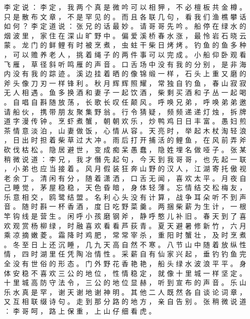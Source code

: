 {李 定 说 ： 李 定 ， 我 两 个 真 是 微 吟 可 以 相 狎 ， 不 必 檀 板 共 金 樽 。
只 是 散 布 文 章 ， 不 是 罕 见 的 。
而 且 各 联 几 句 ， 看 我 们 渔 樵 攀 话 如 何 ？ 李 定 道 说 ： 张 兄 的 话 最 妙 。
请 哥 哥 先 吟 。
船 停 在 绿 水 的 烟 波 里 ， 家 住 在 深 山 旷 野 中 。
偏 爱 溪 桥 春 水 涨 ， 最 怜 岩 石 晓 云 蒙 。
龙 门 的 鲜 鲤 有 时 被 烹 煮 ， 虫 蛀 干 柴 日 烤 烤 。
钓 鱼 的 鱼 多 种 ， 可 以 赡 养 老 人 ， 挑 着 绳 子 的 两 件 事 可 以 完 成 。
小 船 仰 卧 观 看 飞 雁 ， 草 径 斜 听 鸣 雁 的 声 音 。
口 舌 场 中 没 有 我 的 分 别 ， 是 非 海 内 没 有 我 的 踪 迹 。
溪 边 挂 着 晒 的 像 锦 缎 一 样 ， 石 头 上 重 又 磨 的 斧 头 像 刀 刃 一 样 锋 利 。
秋 月 辉 辉 照 耀 ， 常 独 自 钓 鱼 ， 春 山 寂 寂 无 人 相 遇 。
鱼 多 换 酒 和 妻 子 一 起 饮 酒 ， 柴 剩 买 酒 和 子 丛 一 起 喝 。
自 唱 自 斟 随 放 荡 ， 长 歌 长 叹 任 颠 风 。
呼 唤 兄 弟 ， 呼 唤 弟 弟 邀 请 船 伙 ， 携 带 朋 友 聚 集 野 翁 。
行 令 猜 疑 ， 频 频 递 递 灯 烛 ， 拆 牌 道 字 漫 传 钟 。
烹 虾 煮 蟹 ， 朝 朝 欢 乐 ， 炒 鸭 鸡 日 日 丰 富 。
愚 妇 煎 茶 情 意 淡 泊 ， 山 妻 做 饭 ， 心 情 从 容 。
天 亮 时 ， 举 起 木 杖 淘 轻 浪 ， 日 出 时 担 着 柴 草 过 大 冲 。
雨 后 打 开 捕 活 的 鲤 鱼 ， 在 风 前 弄 斧 砍 伐 枯 松 。
隐 居 避 世 ， 变 成 痴 呆 愚 蠢 ， 隐 姓 埋 名 做 哑 子 。
张 某 稍 微 说 道 ： 李 兄 ， 我 才 僭 先 起 句 ， 今 天 到 我 哥 哥 ， 也 先 起 一 联 ， 小 弟 也 应 当 接 着 。
风 月 假 装 狂 奔 山 野 的 汉 人 ， 江 湖 寄 托 傲 视 老 余 丁 。
清 闲 有 分 ， 随 着 潇 洒 ， 口 舌 无 闻 ， 喜 欢 太 平 。
月 夜 自 己 睡 觉 ， 茅 屋 稳 稳 ， 天 色 昏 暗 ， 身 体 轻 薄 。
忘 情 结 交 松 梅 友 ， 乐 意 相 交 ， 鸥 鹭 结 盟 。
名 利 心 头 没 有 计 算 ， 战 争 耳 朵 听 不 到 声 音 。
随 时 斟 一 杯 香 酒 ， 度 日 吃 野 菜 羹 。
两 捆 柴 薪 为 生 计 ， 一 根 竿 钩 线 是 营 生 。
闲 呼 小 孩 磨 钢 斧 ， 静 呼 憨 儿 补 旧 。
春 天 到 了 喜 欢 观 赏 杨 柳 绿 ， 时 融 喜 欢 看 看 芦 荻 青 。
夏 天 避 暑 修 新 竹 ， 六 月 乘 凉 摘 嫩 菱 。
霜 降 时 鸡 肥 ， 常 常 宰 杀 ， 重 阳 时 蟹 壮 ， 及 时 烹 煮 。
冬 至 日 上 还 沉 睡 ， 几 九 天 高 自 然 不 寒 。
八 节 山 中 随 着 放 纵 性 情 ， 四 时 湖 里 任 凭 陶 冶 情 性 。
采 薪 自 有 仙 家 兴 起 ， 垂 钓 钓 鱼 完 全 没 有 世 俗 的 形 态 。
门 外 野 花 香 艳 艳 ， 船 头 绿 水 波 浪 平 平 。
身 体 安 稳 不 喜 欢 三 公 的 地 位 ， 性 情 稳 定 ， 就 像 十 里 城 一 样 坚 定 。
十 里 城 高 防 守 法 令 ， 三 公 的 地 位 显 赫 ， 听 到 宣 布 的 声 音 。
乐 山 乐 水 真 是 罕 ， 谢 天 谢 地 谢 神 明 。
其 他 二 人 既 然 各 自 谈 论 词 章 ， 又 互 相 联 缀 诗 句 。
走 到 那 分 路 的 地 方 ， 亲 自 告 别 。
张 稍 微 说 道 ： 李 哥 呵 ， 路 上 保 重 ， 上 山 仔 细 看 虎 。
}
